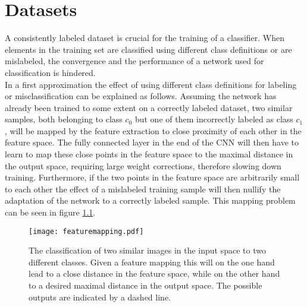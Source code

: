 \chapter{Datasets}

A consistently labeled dataset is crucial for the training of a classifier. When elements in the training set are classified using different class definitions or are mislabeled, the convergence and the performance of a network used for classification is hindered. \\

In a first approximation the effect of using different class definitions for labeling or misclassification can be explained as follows. Assuming the network has already been trained to some extent on a correctly labeled dataset, two similar samples, both belonging to class $c_0$ but one of them incorrectly labeled as class $c_1$, will be mapped by the feature extraction to close proximity of each other in the feature space. The fully connected layer in the end of the CNN will then have to learn to map these close points in the feature space to the maximal distance in the output space, requiring large weight corrections, therefore slowing down training. Furthermore, if the two points in the feature space are arbitrarily small to each other the effect of a mislabeled training sample will then nullify the adaptation of the network to a correctly labeled sample. This mapping problem can be seen in figure \ref{fig:featuremapping}.

\begin{figure}[H]
\centering
\texttt{[image: featuremapping.pdf]}
\caption{The classification of two similar images in the input space to two different classes. Given a feature mapping this will on the one hand lead to a close distance in the feature space, while on the other hand to a desired maximal distance in the output space. The possible outputs are indicated by a dashed line.}
\label{fig:featuremapping}
\end{figure}


